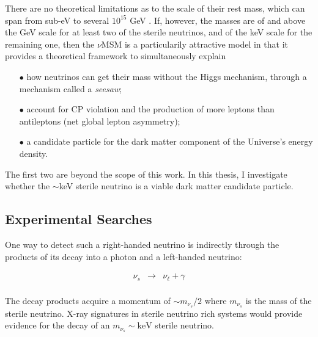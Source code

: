 There are no theoretical limitations as to the scale of their rest mass, which can span from sub-eV to several $10^{15}$ GeV \citep{Drewes_nus}. If, however, the masses are of and above the GeV scale for at least two of the sterile neutrinos, and of the keV scale for the remaining one, then the $\nu$MSM is a particularily attractive model in that it provides a theoretical framework to simultaneously explain\\

\begin{itemize}
\item[$\bullet$] how neutrinos can get their mass without the Higgs mechanism, through a mechanism called a \textit{seesaw};\\
\item[$\bullet$] account for CP violation and the production of more leptons than antileptons (net global lepton asymmetry); \\
\item[$\bullet$] a candidate particle for the dark matter component of the Universe's energy density. \\
\end{itemize} 

The first two are beyond the scope of this work. In this thesis, I investigate whether the $\sim$keV sterile neutrino is a viable dark matter candidate particle. \\


\subsection{Experimental Searches}

One way to detect such a right-handed neutrino is indirectly through the products of its decay into a photon and a left-handed neutrino:

\begin{equation}
\begin{array}{lcr}
\nu_s & \longrightarrow & \nu_\ell + \gamma
\end{array}
\end{equation} \\ The decay products acquire a momentum of $\sim m_{\nu_s}/2$ where $m_{\nu_s}$ is the mass of the sterile neutrino. X-ray signatures in sterile neutrino rich systems would provide evidence for the decay of an $m_{\nu_s} \sim \mathrm{keV}$ sterile neutrino. \\

